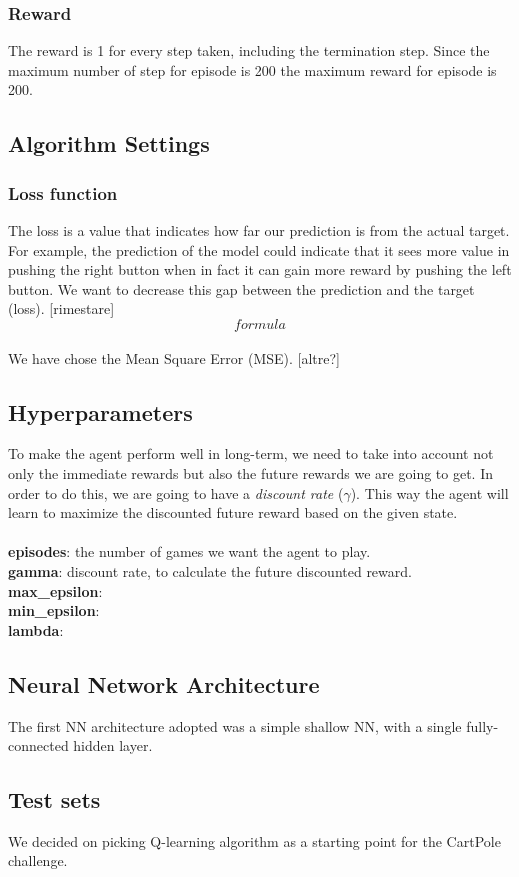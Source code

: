 \subsubsection{Reward}
The reward is 1 for every step taken, including the termination step. Since the maximum number of step for episode is 200 the maximum reward for episode is 200.


\subsection{Algorithm Settings}

\subsubsection{Loss function}

The loss is a value that indicates how far our prediction is from the actual target. For example, the prediction of the model could indicate that it sees more value in pushing the right button when in fact it can gain more reward by pushing the left button. We want to decrease this gap between the prediction and the target (loss).
[rimestare]
\\
\[formula\]
\\We have chose the Mean Square Error (MSE).
[altre?]

\subsection{Hyperparameters}

To make the agent perform well in long-term, we need to take into account not only the immediate rewards but also the future rewards we are going to get. In order to do this, we are going to have a \textit{discount rate} ($\gamma$). This way the agent will learn to maximize the discounted future reward based on the given state.
\\\\\textbf{episodes}: the number of games we want the agent to play.
\\\textbf{gamma}: discount rate, to calculate the future discounted reward.
\\\textbf{max\_epsilon}:
\\\textbf{min\_epsilon}:
\\\textbf{lambda}:


\subsection{Neural Network Architecture}

The first NN architecture adopted was a simple shallow NN, with a single fully-connected hidden layer.

\subsection{Test sets}

We decided on picking Q-learning algorithm as a starting point for the CartPole challenge.


